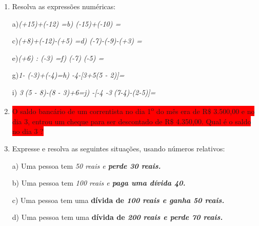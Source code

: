 \documentclass[12pt]{article}
\renewcommand{\_}{\kern-1.5pt\textunderscore\kern-1.5pt}
\begin{document}
\begin{enumerate}
\begin{adjustwidth}{1.23in}{0.0in}
Então\   \( \sqrt[]{4}= \pm ~2   \) ■\par

\end{adjustwidth}


\vspace{\baselineskip}
\setlength{\parskip}{0.0pt}
\textbf{EXERCÍCOS 3}\par

	\item Resolva as expressões numéricas:\par

a)\tab \textit{(+15)+(-12) =\tab \tab \tab b) (-15)+(-10) =}\par

c)\tab \textit{(+8)+(-12)-(+5) =\tab \tab \tab d) (-7)-(-9)-(+3) =}\par

e)\tab \textit{(+6) : (-3) =\tab \tab \tab \tab f) (-7)  (-5) =}\par

g)\tab \textit{1- (-3)+(-4)=\tab \tab \tab h) -4-[3+5(5 - 2)]=}\par

i) \tab \textit{3(5 - 8)-(8 - 3)+6=\tab \tab \tab j) -[-4 -3(7-4)-(2-5)]=}\par

	\item \colorbox{Red}{O saldo bancário de um correntista no dia 1\textsuperscript{o }do mês era de R$\$$  3.500,00 e no dia 3, entrou um cheque para ser descontado de R$\$$  4.350,00. Qual é o saldo no dia 3 ? }\par

	\item Expresse e resolva as seguintes situações, usando números relativos:\par

\tab a) Uma pessoa tem \textit{50 reais e \textbf{perde 30 reais.}}\par

\tab b) Uma pessoa tem \textit{100 reais e \textbf{paga uma dívida 40.}}\par

\tab c) Uma pessoa tem uma \textbf{dívida de \textit{100 reais e ganha 50 reais.}}\par

\tab d) Uma pessoa tem uma \textbf{dívida de \textit{200 reais e perde 70 reais.}}\par


\end{enumerate}
\end{document}

